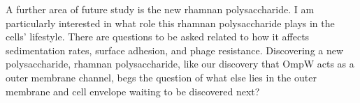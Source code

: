 A further area of future study is the new rhamnan polysaccharide. I am particularly interested in what role this rhamnan polysaccharide plays in the cells' lifestyle. There are questions to be asked related to how it affects sedimentation rates, surface adhesion,  and phage resistance. Discovering a new polysaccharide, rhamnan polysaccharide, like our discovery that OmpW acts as a outer membrane channel, begs the question of what else lies in the outer membrane and cell envelope waiting to be discovered next?

